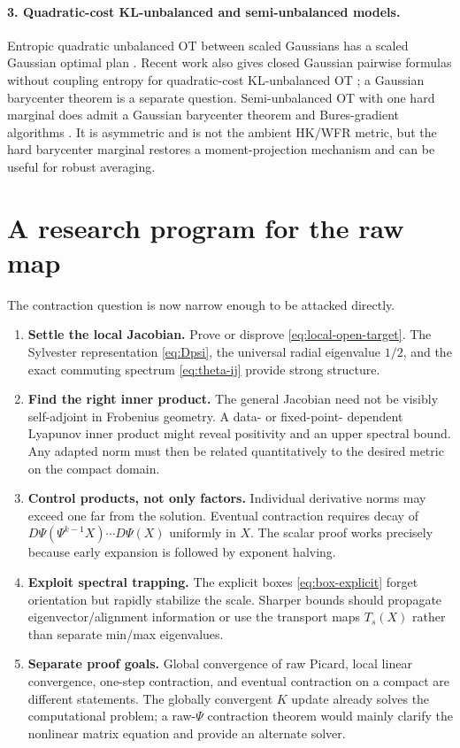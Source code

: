 \documentclass[11pt]{article}
\theoremstyle{definition}
\begin{document}
\paragraph{3. Quadratic-cost KL-unbalanced and semi-unbalanced models.}
Entropic quadratic unbalanced OT between scaled Gaussians has a scaled
Gaussian optimal plan \cite{JanatiEtAl2020UnbalancedGaussian}.  Recent work
also gives closed Gaussian pairwise formulas without coupling entropy for
quadratic-cost KL-unbalanced OT \cite{YangZhang2026}; a Gaussian barycenter
theorem is a separate question.  Semi-unbalanced OT with one hard marginal
does admit a Gaussian barycenter theorem and Bures-gradient algorithms
\cite{NguyenEtAl2026}.  It is asymmetric and is not the ambient HK/WFR metric,
but the hard barycenter marginal restores a moment-projection mechanism and
can be useful for robust averaging.

\section{A research program for the raw map}

The contraction question is now narrow enough to be attacked directly.

\begin{enumerate}
  \item \textbf{Settle the local Jacobian.}  Prove or disprove
  \eqref{eq:local-open-target}.  The Sylvester representation
  \eqref{eq:Dpsi}, the universal radial eigenvalue $1/2$, and the exact
  commuting spectrum \eqref{eq:theta-ij} provide strong structure.

  \item \textbf{Find the right inner product.}  The general Jacobian need not
  be visibly self-adjoint in Frobenius geometry.  A data- or fixed-point-
  dependent Lyapunov inner product might reveal positivity and an upper
  spectral bound.  Any adapted norm must then be related quantitatively to the
  desired metric on the compact domain.

  \item \textbf{Control products, not only factors.}  Individual derivative
  norms may exceed one far from the solution.  Eventual contraction requires
  decay of
  $D\Psi(\Psi^{k-1}X)\cdots D\Psi(X)$ uniformly in $X$.  The scalar proof works
  precisely because early expansion is followed by exponent halving.

  \item \textbf{Exploit spectral trapping.}  The explicit boxes
  \eqref{eq:box-explicit} forget orientation but rapidly stabilize the scale.
  Sharper bounds should propagate eigenvector/alignment information or use
  the transport maps $T_s(X)$ rather than separate min/max eigenvalues.

  \item \textbf{Separate proof goals.}  Global convergence of raw Picard,
  local linear convergence, one-step contraction, and eventual contraction
  on a compact are different statements.  The globally convergent $K$ update
  already solves the computational problem; a raw-$\Psi$ contraction theorem
  would mainly clarify the nonlinear matrix equation and provide an alternate
  solver.
\end{enumerate}
\end{document}
